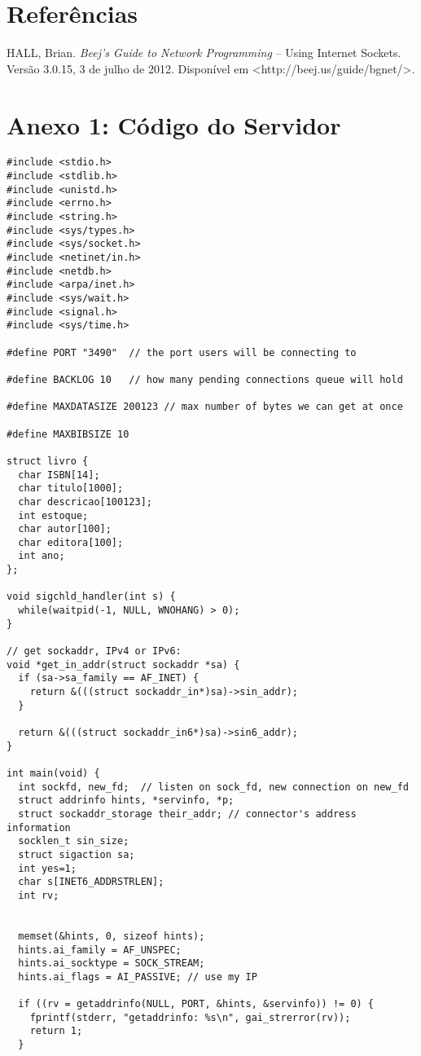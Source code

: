 \documentclass[11pt, brazil]{article} %
\begin{document}
\section{Referências}

HALL, Brian. \emph{Beej's Guide to Network Programming} -- Using Internet Sockets. Versão 3.0.15, 3 de julho de 2012. Disponível em <http://beej.us/guide/bgnet/>.

\section*{Anexo 1: Código do Servidor}

\begin{verbatim}
#include <stdio.h>
#include <stdlib.h>
#include <unistd.h>
#include <errno.h>
#include <string.h>
#include <sys/types.h>
#include <sys/socket.h>
#include <netinet/in.h>
#include <netdb.h>
#include <arpa/inet.h>
#include <sys/wait.h>
#include <signal.h>
#include <sys/time.h>

#define PORT "3490"  // the port users will be connecting to

#define BACKLOG 10	 // how many pending connections queue will hold

#define MAXDATASIZE 200123 // max number of bytes we can get at once

#define MAXBIBSIZE 10

struct livro {
  char ISBN[14];
  char titulo[1000];
  char descricao[100123];
  int estoque;
  char autor[100];
  char editora[100];
  int ano;
};

void sigchld_handler(int s) {
  while(waitpid(-1, NULL, WNOHANG) > 0);
}

// get sockaddr, IPv4 or IPv6:
void *get_in_addr(struct sockaddr *sa) {
  if (sa->sa_family == AF_INET) {
    return &(((struct sockaddr_in*)sa)->sin_addr);
  }

  return &(((struct sockaddr_in6*)sa)->sin6_addr);
}

int main(void) {
  int sockfd, new_fd;  // listen on sock_fd, new connection on new_fd
  struct addrinfo hints, *servinfo, *p;
  struct sockaddr_storage their_addr; // connector's address information
  socklen_t sin_size;
  struct sigaction sa;
  int yes=1;
  char s[INET6_ADDRSTRLEN];
  int rv;


  memset(&hints, 0, sizeof hints);
  hints.ai_family = AF_UNSPEC;
  hints.ai_socktype = SOCK_STREAM;
  hints.ai_flags = AI_PASSIVE; // use my IP

  if ((rv = getaddrinfo(NULL, PORT, &hints, &servinfo)) != 0) {
    fprintf(stderr, "getaddrinfo: %s\n", gai_strerror(rv));
    return 1;
  }


\end{verbatim}
\end{document}
